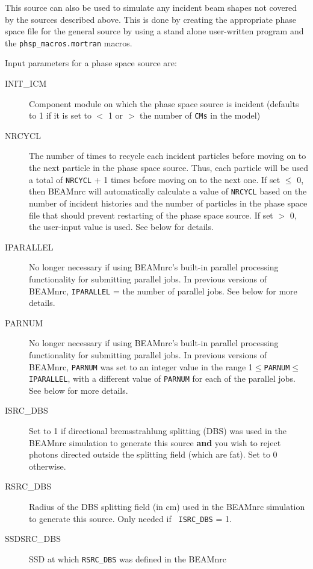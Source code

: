 \documentclass[12pt,twoside]{article}
\begin{document}
This source can also be used to simulate any incident beam shapes not
covered by the sources described above.  This is done by creating the
appropriate phase space file for the general source by using a stand alone
user-written program and the \verb+phsp_macros.mortran+ macros.

Input parameters for a phase space source are:
\begin{description}
\item [INIT\_ICM] Component module on which the phase space source is
incident (defaults to 1 if it is set to $<$ 1 or $>$ the number of
\verb+CMs+
in the model)
\item [NRCYCL] The number of times to recycle each incident particles before
moving on to the next particle in the phase space source.  Thus, each
particle will be used a total of {\tt NRCYCL} + 1 times before moving
on to the next one.  If set $\leq$ 0, then BEAMnrc will automatically
calculate a value of {\tt NRCYCL} based on the number of incident histories
and the number of particles in the phase space file that should prevent
restarting of the phase space source.  If set $>$ 0, the user-input value
is used.  See below for details.
\item [IPARALLEL]  No longer necessary if using BEAMnrc's built-in
parallel processing functionality for submitting parallel jobs.  In
previous versions of BEAMnrc, {\tt IPARALLEL} = the number of parallel jobs.
See below for more details.
\item [PARNUM] No longer necessary if using BEAMnrc's built-in
parallel processing functionality for submitting parallel jobs.  In
previous versions of BEAMnrc, {\tt PARNUM}
was set to an integer value in the range 1$\leq${\tt PARNUM}$\leq$
{\tt IPARALLEL}, with a different value of {\tt PARNUM} for each of
the parallel jobs.  See below for more details.
\item [ISRC\_DBS] Set to 1 if directional bremsstrahlung splitting (DBS)
was used in the BEAMnrc simulation to generate this source {\bf and} you wish to
reject photons directed outside the splitting field (which are fat).  Set to 0
otherwise.
\item [RSRC\_DBS] Radius of the DBS splitting field (in cm) used in the
BEAMnrc simulation to generate this source. Only needed if {\tt
ISRC\_DBS} = 1.
\item [SSDSRC\_DBS] SSD at which {\tt RSRC\_DBS} was defined in the BEAMnrc

\end{description}
\end{document}
